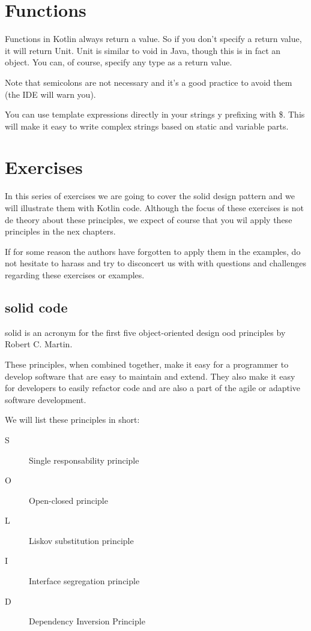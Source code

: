 \section{Functions}
Functions in Kotlin always return a value. So if you don’t specify a return value, it will return Unit.
Unit is similar to void in Java, though this is in fact an object. You can, of course,
specify any type as a return value.

Note that semicolons are not  necessary
and it’s a good practice to avoid them (the IDE will warn you).

You can use template expressions directly in your strings y prefixing with \$. This will make
it easy to write complex strings based on static and variable parts. 

\section{Exercises }
In this series of exercises we are going to cover the \gls{solid} design pattern and we will illustrate them with Kotlin code. Although the focus of these exercises is not de theory about these principles, we expect of course that you wil apply these principles in the nex chapters. 

If for some reason the authors  have forgotten to apply them in the examples, do not hesitate to  harass and try to disconcert us with with questions and challenges regarding these exercises or examples. 


\subsection{\gls{solid} code}
\gls{solid} is an acronym for the first five object-oriented design \gls{ood} principles by Robert C. Martin.

These principles, when combined together, make it easy for a programmer to develop software that are easy to maintain and extend. They also make it easy for developers to easily refactor code and are also a part of the agile or adaptive software development.

We will list these principles in short:

\begin{description}
	\item[S] Single responsability principle
	\item[O] Open-closed principle
	\item[L] Liskov substitution principle
	\item[I] Interface segregation principle
	\item[D] Dependency Inversion Principle
\end{description}

